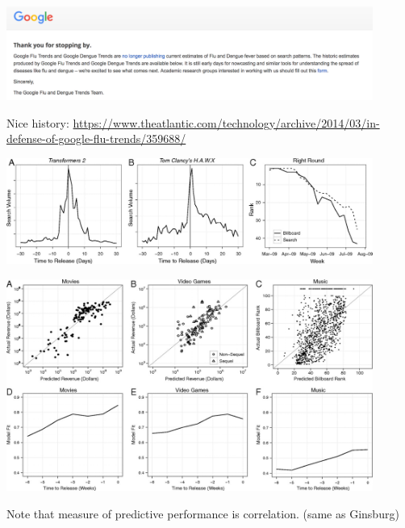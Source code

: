 \documentclass[aspectratio=169]{beamer}
\begin{document}
\begin{frame}

\begin{center}
  \includegraphics[width = 0.9\textwidth]{figures/google_flu_closed}
\end{center}

\vfill
Nice history: \url{https://www.theatlantic.com/technology/archive/2014/03/in-defense-of-google-flu-trends/359688/}

\end{frame}
\begin{frame}

\begin{center}
  \includegraphics[width = 0.9\textwidth]{figures/goel_predicting_2010_fig1}
\end{center}

\end{frame}
\begin{frame}

\begin{center}
  \includegraphics[width = 0.9\textwidth]{figures/goel_predicting_2010_fig2}
\end{center}

\vfill
Note that measure of predictive performance is correlation. (same as Ginsburg)
\end{frame}
\end{document}
